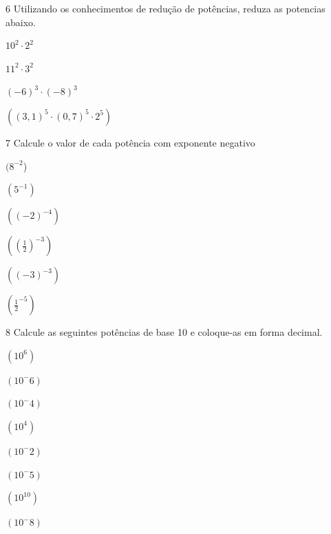 \num{6} Utilizando os conhecimentos de redução de potências, reduza as
potencias abaixo.

\begin{escolha}
\item $10^2 \cdot 2^2$  
\item $11^2 \cdot 3^2$  
\item $(-6)^3 \cdot (-8)^3$  
\item $((3,1)^5 \cdot (0,7)^5 \cdot 2^5)$  
\end{escolha}





\num{7} Calcule o valor de cada potência com exponente negativo

\begin{escolha}
\item $(8^{-2}$) 
\item $(5^{-1})$ 
\item $((-2)^{-4}) $
\item $((\frac{1}{2})^{-3}) $
\item $((-3)^{-3}) $
\item $(\frac{1}{2}^{-5}) $
\end{escolha}


\num{8} Calcule as seguintes potências de base 10 e coloque-as em forma
decimal.

\begin{escolha}
\item $(10^6)$
\item $(10^-6)$
\item $(10^-4)$
\item $(10^4)$
\item $(10^-2)$
\item $(10 ^-5)$
\item $(10^10)$
\item $(10^-8)$
\end{escolha}

